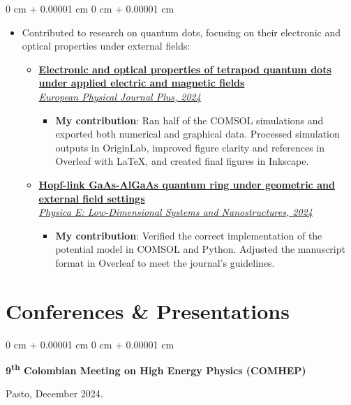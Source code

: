 \documentclass[10pt, letterpaper]{article}
\newenvironment{highlights}{
    \begin{itemize}[
        topsep=0.10 cm,
        parsep=0.10 cm,
        partopsep=0pt,
        itemsep=0pt,
        leftmargin=0 cm + 10pt
    ]
}{
    \end{itemize}
}
\newenvironment{onecolentry}{
    \begin{adjustwidth}{
        0 cm + 0.00001 cm
    }{
        0 cm + 0.00001 cm
    }
}{
    \end{adjustwidth}
}
\newenvironment{twocolentry}[2][]{
    \onecolentry
    \def\secondColumn{#2}
    \setcolumnwidth{\fill, 4.5 cm}
    \begin{paracol}{2}
}{
    \switchcolumn \raggedleft \secondColumn
    \end{paracol}
    \endonecolentry
}
\begin{document}
    \vspace{0.10 cm}
    \begin{onecolentry}
        \begin{highlights}
            \item Contributed to research on quantum dots, focusing on their electronic and optical properties under external fields:
            \begin{itemize}
                \item \href{https://doi.org/10.1140/epjp/s13360-024-05089-z}{\textbf{Electronic and optical properties of tetrapod quantum dots under applied electric and magnetic fields} \\ \textit{European Physical Journal Plus, 2024}}
                \begin{itemize}
                    \item \textbf{My contribution}: Ran half of the COMSOL simulations and exported both numerical and graphical data. Processed simulation outputs in OriginLab, improved figure clarity and references in Overleaf with \LaTeX, and created final figures in Inkscape.
                \end{itemize}

                \item \href{https://doi.org/10.1016/j.physe.2024.116032}{\textbf{Hopf-link GaAs-AlGaAs quantum ring under geometric and external field settings} \\ \textit{Physica E: Low-Dimensional Systems and Nanostructures, 2024}}
                \begin{itemize}
                    \item \textbf{My contribution}: Verified the correct implementation of the potential model in COMSOL and Python. Adjusted the manuscript format in Overleaf to meet the journal’s guidelines.
                \end{itemize}
            \end{itemize}
        \end{highlights}
    \end{onecolentry}

    \section{Conferences \& Presentations}
    \begin{twocolentry}{
        Pasto, December 2024.
    }
        \textbf{9\textsuperscript{th} Colombian Meeting on High Energy Physics (COMHEP)}
    \end{twocolentry}
\end{document}
